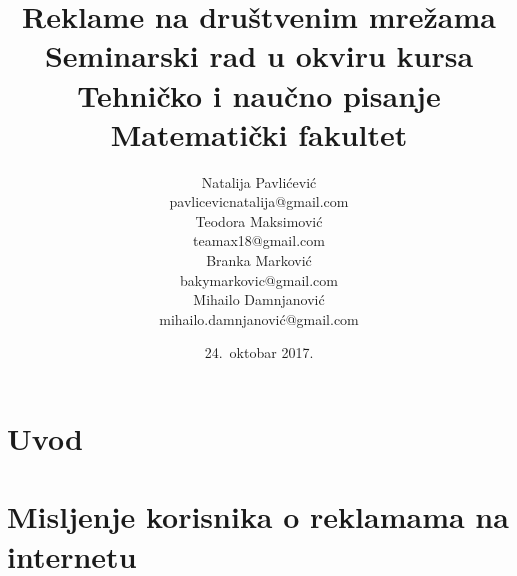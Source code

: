 \documentclass[a4paper]{article}
\title{Reklame na društvenim mrežama\\ \small{Seminarski rad u okviru kursa\\Tehničko i naučno pisanje\\ Matematički fakultet}}
\author{Natalija Pavlićević\\ pavlicevicnatalija@gmail.com\\ Teodora Maksimović\\ teamax18@gmail.com\\ Branka Marković\\ bakymarkovic@gmail.com\\ Mihailo Damnjanović\\ mihailo.damnjanović@gmail.com}
\date{24.~oktobar 2017.}
\begin{document}
	
\section{Uvod}
\label{sec:uvod}
	\section{Misljenje korisnika o reklamama na internetu}
	
\end{document}
